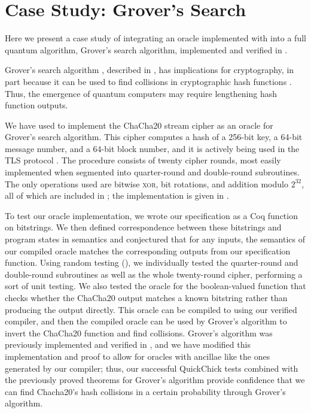 \section{Case Study: Grover's Search}
\label{sec:grovers}

Here we present a case study of integrating an oracle implemented with \name into a full quantum algorithm, Grover's search algorithm, implemented and verified in \sqir.

Grover's search algorithm \cite{grover1996,grover1997}, described in , has implications for cryptography, in part because it can be used to find collisions in cryptographic hash functions \cite{grover-hash}. Thus, the emergence of quantum computers may require lengthening hash function outputs.

We have used \vqimp to implement the ChaCha20 stream cipher \cite{chacha} as an oracle for Grover's search algorithm. 
%
This cipher computes a hash of a 256-bit key, a 64-bit message number, and a 64-bit block number, and it is actively being used in the TLS protocol \cite{rfc7905,rfc8446}.
The procedure consists of twenty cipher rounds, most easily implemented when segmented into quarter-round and double-round subroutines. 
The only operations used are bitwise \textsc{xor}, bit rotations, and addition modulo $2^{32}$, all of which are included in \vqimp; the implementation is given in .

To test our oracle implementation, we wrote our specification as a Coq function on bitstrings.
We then defined correspondence between these bitstrings and program states in \vqir semantics and conjectured that for any inputs, the semantics of our compiled oracle matches the corresponding outputs from our specification function.
Using random testing (),
we individually tested the quarter-round and double-round subroutines as well as the whole twenty-round cipher, performing a sort of unit testing.
We also tested the oracle for the boolean-valued function that checks whether the ChaCha20 output matches a known bitstring rather than producing the output directly.
This oracle can be compiled to \sqir using our verified compiler, and then the compiled oracle can be used by Grover's algorithm to invert the ChaCha20 function and find collisions.
Grover's algorithm was previously implemented and verified in \sqir \cite{PQPC}, and we have modified this implementation and proof to allow for oracles with ancillae like the ones generated by our compiler; thus, our successful QuickChick tests combined with the previously proved theorems for Grover's algorithm provide confidence that we can find Chacha20's hash collisions in a certain probability through Grover's algorithm.

